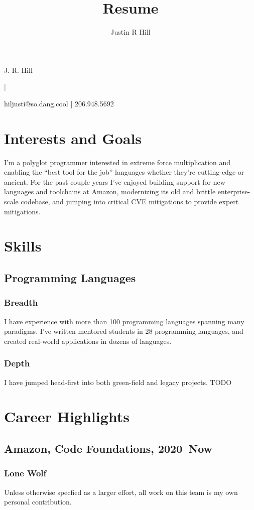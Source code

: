 \documentclass{article}
\author{Justin R Hill}
\title{Resume}
\makeatletter
\renewcommand{\maketitle}{
\begin{center}
\huge
J. R. Hill

|

\Large
hiljusti@so.dang.cool | 206.948.5692
\end{center}
}
\makeatother
\begin{document}
\maketitle


\section{Interests and Goals}

I'm a polyglot programmer interested in extreme force multiplication and
enabling the ``best tool for the job'' languages whether they're cutting-edge
or ancient. For the past couple years I've enjoyed building support for new
languages and toolchains at Amazon, modernizing its old and brittle
enterprise-scale codebase, and jumping into critical CVE mitigations to provide
expert mitigations.


\section{Skills}

\subsection{Programming Languages}

\subsubsection{Breadth}
I have experience with more than 100 programming languages spanning many
paradigms. I've written mentored students in 28 programming languages, and
created real-world applications in dozens of languages.

\subsubsection{Depth}
I have jumped head-first into both green-field and legacy projects. TODO

\section{Career Highlights}

\subsection{Amazon, Code Foundations, 2020--Now}

\subsubsection{Lone Wolf}
Unless otherwise specfied as a larger effort, all work on this team is my own
personal contribution.
\end{document}
